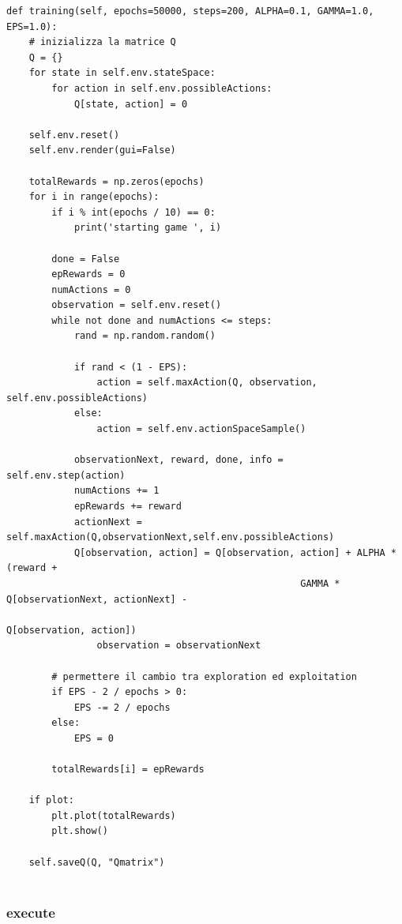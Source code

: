 \begin{minipage}{\linewidth}
\begin{lstlisting}[style=python]
def training(self, epochs=50000, steps=200, ALPHA=0.1, GAMMA=1.0, EPS=1.0):
	# inizializza la matrice Q
	Q = {}
	for state in self.env.stateSpace:
		for action in self.env.possibleActions:
			Q[state, action] = 0

	self.env.reset()
	self.env.render(gui=False)

	totalRewards = np.zeros(epochs)
	for i in range(epochs):
		if i % int(epochs / 10) == 0:
			print('starting game ', i)

		done = False
		epRewards = 0
		numActions = 0
		observation = self.env.reset()
		while not done and numActions <= steps:
			rand = np.random.random()
			
			if rand < (1 - EPS):
				action = self.maxAction(Q, observation, self.env.possibleActions)
			else:
				action = self.env.actionSpaceSample()

			observationNext, reward, done, info = self.env.step(action)
			numActions += 1
			epRewards += reward
			actionNext = self.maxAction(Q,observationNext,self.env.possibleActions)
			Q[observation, action] = Q[observation, action] + ALPHA * (reward +
													GAMMA * Q[observationNext, actionNext] - 
															Q[observation, action])
				observation = observationNext

		# permettere il cambio tra exploration ed exploitation
		if EPS - 2 / epochs > 0:
			EPS -= 2 / epochs
		else:
			EPS = 0

		totalRewards[i] = epRewards

	if plot:
		plt.plot(totalRewards)
		plt.show()
		
	self.saveQ(Q, "Qmatrix")
	
\end{lstlisting}
\end{minipage}

\subsubsection{execute}

